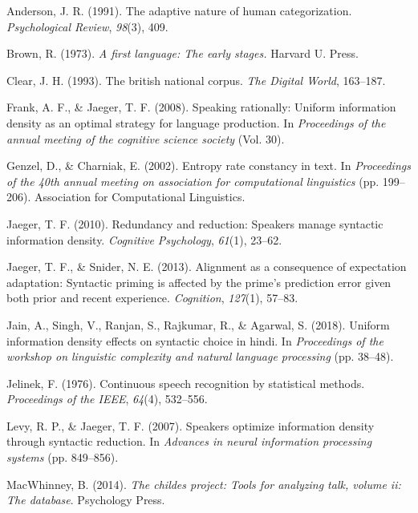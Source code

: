 \documentclass[10pt, letterpaper]{article}
\begin{document}
\hypertarget{refs}{}
\hypertarget{ref-anderson1991}{}
Anderson, J. R. (1991). The adaptive nature of human categorization.
\emph{Psychological Review}, \emph{98}(3), 409.

\hypertarget{ref-brown1973}{}
Brown, R. (1973). \emph{A first language: The early stages.} Harvard U.
Press.

\hypertarget{ref-clear1993british}{}
Clear, J. H. (1993). The british national corpus. \emph{The Digital
World}, 163--187.

\hypertarget{ref-frank2008speaking}{}
Frank, A. F., \& Jaeger, T. F. (2008). Speaking rationally: Uniform
information density as an optimal strategy for language production. In
\emph{Proceedings of the annual meeting of the cognitive science
society} (Vol. 30).

\hypertarget{ref-genzel2002}{}
Genzel, D., \& Charniak, E. (2002). Entropy rate constancy in text. In
\emph{Proceedings of the 40th annual meeting on association for
computational linguistics} (pp. 199--206). Association for Computational
Linguistics.

\hypertarget{ref-jaeger2010}{}
Jaeger, T. F. (2010). Redundancy and reduction: Speakers manage
syntactic information density. \emph{Cognitive Psychology},
\emph{61}(1), 23--62.

\hypertarget{ref-jaeger2013}{}
Jaeger, T. F., \& Snider, N. E. (2013). Alignment as a consequence of
expectation adaptation: Syntactic priming is affected by the prime's
prediction error given both prior and recent experience.
\emph{Cognition}, \emph{127}(1), 57--83.

\hypertarget{ref-jain2018}{}
Jain, A., Singh, V., Ranjan, S., Rajkumar, R., \& Agarwal, S. (2018).
Uniform information density effects on syntactic choice in hindi. In
\emph{Proceedings of the workshop on linguistic complexity and natural
language processing} (pp. 38--48).

\hypertarget{ref-jelinek1976}{}
Jelinek, F. (1976). Continuous speech recognition by statistical
methods. \emph{Proceedings of the IEEE}, \emph{64}(4), 532--556.

\hypertarget{ref-levy2007}{}
Levy, R. P., \& Jaeger, T. F. (2007). Speakers optimize information
density through syntactic reduction. In \emph{Advances in neural
information processing systems} (pp. 849--856).

\hypertarget{ref-macwhinney2014}{}
MacWhinney, B. (2014). \emph{The childes project: Tools for analyzing
talk, volume ii: The database}. Psychology Press.
\end{document}
